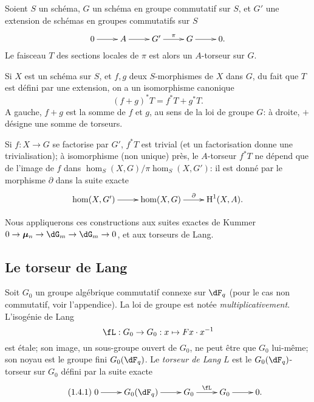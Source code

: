 \subsection{}\label{VI:1-3}

Soient $S$ un sch\'ema, $G$ un sch\'ema en groupe commutatif sur $S$, et $G'$ 
une extension de sch\'emas en groupes commutatifs sur $S$
\[\xymatrix{
  0 \ar[r] 
    & A \ar[r] 
    & G' \ar[r]^-\pi 
    & G \ar[r] 
    & 0 \text{.}
}\]
Le faisceau $T$ des sections locales de $\pi$ est alors un $A$-torseur sur 
$G$. 

Si $X$ est un sch\'ema sur $S$, et $f,g$ deux $S$-morphismes de $X$ dans $G$, 
du fait que $T$ est d\'efini par une extension, on a un isomorphisme 
canonique 
\begin{equation*}\tag{1.3.1}\label{VI:eq:1-3-1}
  (f+g)^\ast T = f^\ast T + g^\ast T \text{.}
\end{equation*}
A gauche, $f+g$ est la somme de $f$ et $g$, au sens de la loi de groupe $G$: 
\`a droite, $+$ d\'esigne une somme de torseurs. 

Si $f:X\to G$ se factorise par $G'$, $f^\ast T$ est trivial (et un 
factorisation donne une trivialisation); \`a isomorphisme (non unique) pr\`es, 
le $A$-torseur $f^\ast T$ ne d\'epend que de l'image de $f$ dans 
$\hom_S(X,G)/\pi\hom_S(X,G')$: il est donn\'e par le morphisme $\partial$ dans 
la suite exacte 
\[\xymatrix{
  \hom(X,G') \ar[r] 
    & \hom(X,G) \ar[r]^-\partial 
    & \h^1(X,A) \text{.}
}\]

Nous appliquerons ces constructions aux suites exactes de Kummer 
$0 \to \dmu_n \to \dG_m \to \dG_m \to 0$, et aux torseurs de Lang. 





\subsection{Le torseur de Lang}\label{VI:1-4}

Soit $G_0$ un groupe alg\'ebrique commutatif connexe sur $\dF_q$ (pour le cas 
non commutatif, voir l'appendice). La loi de groupe est not\'ee 
\emph{multiplicativement}. L'isog\'enie de Lang 
\[
\fL:G_0 \to G_0: x\mapsto F x\cdot x^{-1}
\]
est \'etale; son image, un sous-groupe ouvert de $G_0$, ne peut \^etre que 
$G_0$ lui-m\^eme; son noyau est le groupe fini $G_0(\dF_q)$. Le \emph{torseur 
de Lang} $L$ est le $G_0(\dF_q)$-torseur sur $G_0$ d\'efini par la suite 
exacte 
\begin{equation*}\tag{1.4.1}\label{VI:eq:1-4-1}
\xymatrix{
  0 \ar[r] 
    & G_0(\dF_q) \ar[r] 
    & G_0 \ar[r]^-\fL 
    & G_0 \ar[r] 
    & 0 \text{.}
}
\end{equation*}


